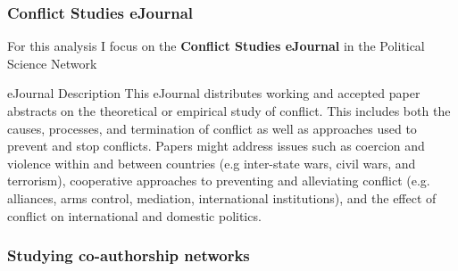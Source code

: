 \documentclass[xcolor=dvipsnames, 9pt]{beamer}
\begin{document}
\begin{frame}[fragile]
    \frametitle{Conflict Studies eJournal}
    For this analysis I focus on the \textbf{Conflict Studies eJournal} in the Political Science Network
    \begin{block}{eJournal Description}
        This eJournal distributes working and accepted paper abstracts on the theoretical or empirical study of conflict. This includes both the causes, processes, and termination of conflict as well as approaches used to prevent and stop conflicts. Papers might address issues such as coercion and violence within and between countries (e.g inter-state wars, civil wars, and terrorism), cooperative approaches to preventing and alleviating conflict (e.g. alliances, arms control, mediation, international institutions), and the effect of conflict on international and domestic politics. 
   \end{block}
\end{frame}

\begin{frame}[fragile]
    \frametitle{Studying co-authorship networks}
    \begin{center}
    \end{center}
\end{frame}

\end{document}

